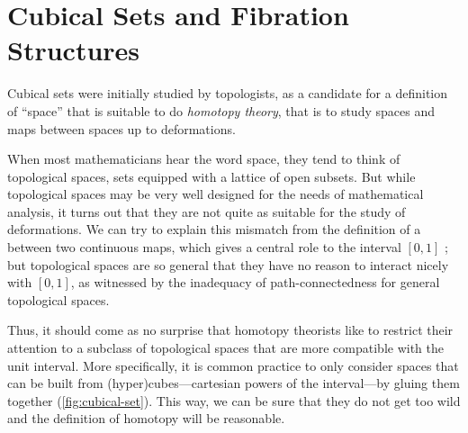 \section{Cubical Sets and Fibration Structures}
\label{sec:cubical_sets}

Cubical sets were initially studied by topologists, as a candidate for a 
definition of ``space'' that is suitable to do \emph{homotopy theory}, that is 
to study spaces and maps between spaces up to deformations.

When most mathematicians hear the word space, they tend to think of topological
spaces, \ie sets equipped with a lattice of open subsets. 
% 
But while topological spaces may be very well designed for the needs of 
mathematical analysis, it turns out that they are not quite as suitable for 
the study of deformations. 
% 
We can try to explain this mismatch from the definition of a 
 between two continuous maps, 
which gives a central role to the interval \( [0, 1] \) ; but topological 
spaces are so general that they have no reason to interact nicely with \( [0, 1] \),
as witnessed by the inadequacy of path-connectedness for general topological 
spaces.

Thus, it should come as no surprise that homotopy theorists like to restrict their 
attention to a subclass of topological spaces that are more compatible with
the unit interval. 
More specifically, it is common practice to only consider spaces that can be 
built from (hyper)cubes---cartesian powers of the interval---by gluing them together 
(\cref{fig:cubical-set}). This way, we can be sure that they do not 
get too wild and the definition of homotopy will be reasonable.

